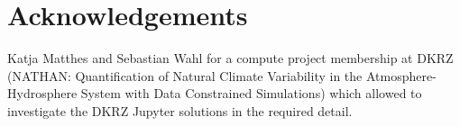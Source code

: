 \documentclass[11pt,a4paper]{article}
\begin{document}




\section{Acknowledgements}

Katja Matthes and Sebastian Wahl for a compute project membership at DKRZ (NATHAN: Quantification of Natural Climate Variability in the Atmosphere-Hydrosphere System with Data Constrained Simulations) which allowed to investigate the DKRZ Jupyter solutions in the required detail.


\appendix







\end{document}
